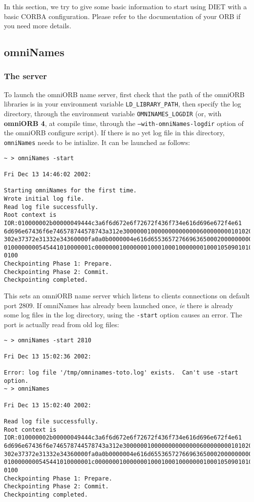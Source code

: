 In this section, we try to give some basic information to start using DIET with
a basic CORBA configuration. Please refer to the documentation of your ORB if
you need more details.

\subsection{omniNames}

\subsubsection{The server}

To launch the omniORB name server, first check that the path of the omniORB
libraries is in your environment variable \texttt{LD\_LIBRARY\_PATH}, then
specify the log directory, through the environment variable
\texttt{OMNINAMES\_LOGDIR} (or, with \textbf{omniORB 4}, at compile time,
through the \texttt{--with-omniNames-logdir} option of the omniORB configure
script). If there is no yet log file in this directory, \texttt{omniNames} needs to be intialize. It can be launched as follows:
{\footnotesize
\begin{verbatim}
~ > omniNames -start

Fri Dec 13 14:46:02 2002:

Starting omniNames for the first time.
Wrote initial log file.
Read log file successfully.
Root context is IOR:010000002b00000049444c3a6f6d672e6f72672f436f734e616d696e672f4e61
6d696e67436f6e746578744578743a312e300000010000000000000060000000010102000d0000003134
302e37372e31332e34360000fa0a0b0000004e616d655365727669636500020000000000000008000000
0100000000545441010000001c0000000100000001000100010000000100010509010100010000000901
0100
Checkpointing Phase 1: Prepare.
Checkpointing Phase 2: Commit.
Checkpointing completed.
\end{verbatim}
}

This sets an omniORB name server which listens to clients
connections on default port 2809. If omniNames has already been launched once,
\emph{ie} there is already some log files in the log directory, using the
\texttt{-start} option causes an error. The port is actually read from old
log files:
{\footnotesize
\begin{verbatim}
~ > omniNames -start 2810

Fri Dec 13 15:02:36 2002:

Error: log file '/tmp/omninames-toto.log' exists.  Can't use -start option.
~ > omniNames  

Fri Dec 13 15:02:40 2002:

Read log file successfully.
Root context is IOR:010000002b00000049444c3a6f6d672e6f72672f436f734e616d696e672f4e61
6d696e67436f6e746578744578743a312e300000010000000000000060000000010102000d0000003134
302e37372e31332e34360000fa0a0b0000004e616d655365727669636500020000000000000008000000
0100000000545441010000001c0000000100000001000100010000000100010509010100010000000901
0100
Checkpointing Phase 1: Prepare.
Checkpointing Phase 2: Commit.
Checkpointing completed.
\end{verbatim}
}


